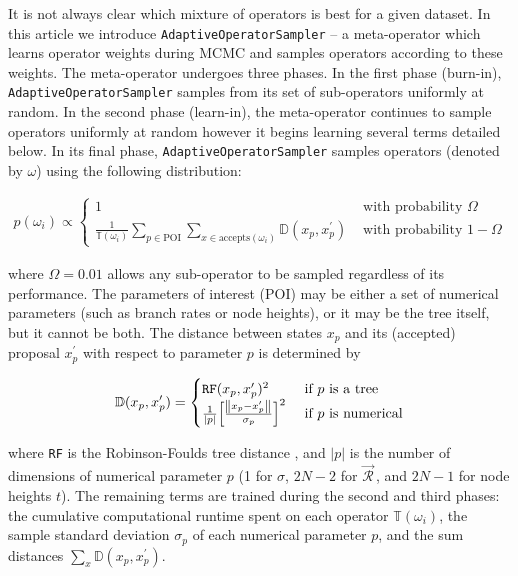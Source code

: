 \documentclass[10pt,letterpaper]{article}
\begin{document}
It is not always clear which mixture of operators is best for a given dataset.
In this article we introduce \texttt{AdaptiveOperatorSampler} -- a meta-operator which learns operator weights during MCMC and samples operators according to these weights.
The meta-operator undergoes three phases.
In the first phase (burn-in), \texttt{AdaptiveOperatorSampler} samples from its set of sub-operators uniformly at random.
In the second phase (learn-in), the meta-operator continues to sample operators uniformly at random however it begins learning several terms detailed below.
In its final phase, \texttt{AdaptiveOperatorSampler} samples operators (denoted by $\omega$) using the following distribution:


\begin{align}
\label{eqn:adaptiveSampler}
	p(\omega_i) \propto \begin{cases} 1 & \text{ with probability } \Omega \\ \frac{1}{\mathbb{T}(\omega_i)} \sum\limits_{p \in \text{POI}}  \sum\limits_{x \in \text{accepts}(\omega_i)}  \mathbb{D}(x_p, x_p^\prime) & \text{ with probability } 1-\Omega \end{cases}
\end{align}

where $\Omega = 0.01$ allows any sub-operator to be sampled regardless of its performance.
The parameters of interest (POI) may be either a set of numerical parameters (such as branch rates or node heights), or it may be the tree itself, but it cannot be both.
The distance between states $x_p$ and its (accepted) proposal $x_p^\prime$ with respect to parameter $p$ is determined by


\begin{align}
\label{eqn:distanceFunctions} 
	\mathbb{D}(x_p, x_p^\prime) = \begin{cases} \texttt{RF}(x_p, x_p^\prime)^2 & \text{ if } p \text{ is a tree} \\ 
	\frac{1}{|p|} \Big[ \frac{\norm{x_p - x_p^\prime}}{\sigma_p} \Big]^2    & \text{ if } p \text{ is numerical}  \end{cases}
\end{align}


where \texttt{RF} is the Robinson-Foulds tree distance \cite{robinson1981comparison}, and $|p|$ is the number of dimensions of numerical parameter $p$ (1 for $\sigma$, $2N-2$ for $\vec{\mathcal{R}}^{\,}$, and $2N-1$ for node heights $t$).
The remaining terms are trained during the second and third phases: the cumulative computational runtime spent on each operator $\mathbb{T}(\omega_i)$, the sample standard deviation $\sigma_p$ of each numerical parameter $p$, and the sum distances $\sum_x \mathbb{D}(x_p, x_p^\prime)$.
\end{document}
